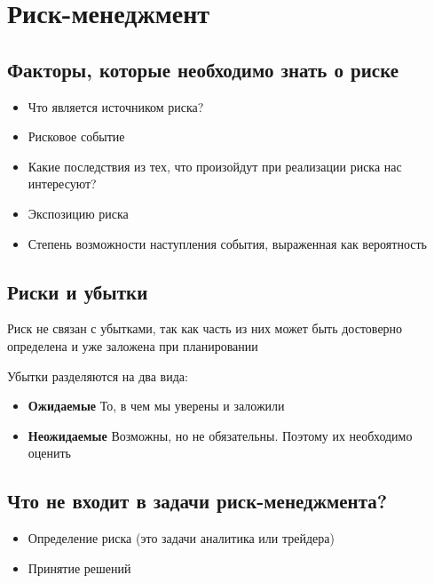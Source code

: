 \documentclass{article}
\begin{document}
    \section{Риск-менеджмент}

        \subsection{Факторы, которые необходимо знать о риске}
            \begin{itemize}
                \item Что является источником риска?
                \item Рисковое событие
                \item Какие последствия из тех, что произойдут при реализации риска нас интересуют?
                \item Экспозицию риска
                \item Степень возможности наступления события, выраженная как вероятность
            \end{itemize}

       \subsection{Риски и убытки}


            Риск не связан с убытками, так как часть из них может быть достоверно определена и уже заложена при планировании

            \quad

            Убытки разделяются на два вида:

            \begin{itemize}
                \item \textbf{Ожидаемые} То, в чем мы уверены и заложили
                \item \textbf{Неожидаемые} Возможны, но не обязательны. Поэтому их необходимо оценить
            \end{itemize}


        \subsection{Что не входит в задачи риск-менеджмента?}

            \begin{itemize}
                \item Определение риска (это задачи аналитика или трейдера)
                \item Принятие решений
            \end{itemize}
\end{document}
